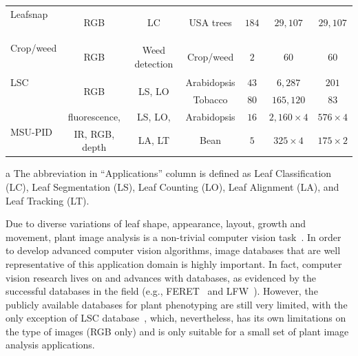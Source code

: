 \begin{table}[t!]
\begin{threeparttable}
\begin{tabular}{l|c|c|c|c|c|c}
Leafsnap & \multirow{2}{*}{RGB} & \multirow{2}{*}{LC} & \multirow{2}{*}{USA trees} & \multirow{2}{*}{$184$} & \multirow{2}{*}{$29,107$} & \multirow{2}{*}{$29,107$} \\
~\cite{kumar2012leafsnap} & & & & & & \\ \hline
Crop/weed & \multirow{2}{*}{RGB} & \multirow{2}{*}{Weed detection} & \multirow{2}{*}{Crop/weed} & \multirow{2}{*}{$2$} & \multirow{2}{*}{$60$} & \multirow{2}{*}{$60$} \\
~\cite{haug2014crop} & & & & & & \\ \hline
LSC & \multirow{2}{*}{RGB} & \multirow{2}{*}{LS, LO} & Arabidopsis & $43$ & $6,287$ & $201$ \\ \cline{4-7}
~\cite{haug2014crop} & & & Tobacco & $80$ & $165,120$ & $83$ \\ \hline
\multirow{2}{*}{MSU-PID} & fluorescence, & LS, LO, & Arabidopsis & $16$ & $2,160\times 4$ & $576\times 4$ \\ \cline{4-7}
& IR, RGB, depth & LA, LT & Bean & $5$ & $325\times 4$ & $175\times 2$ \\ \hline
\hline
\end{tabular}
\begin{tablenotes}
\footnotesize
\item[a] The abbreviation in ``Applications'' column is defined as Leaf Classification (LC), Leaf Segmentation (LS), Leaf Counting (LO), Leaf Alignment (LA), and Leaf Tracking (LT).
\end{tablenotes}
\end{threeparttable}
\label{tab:database}
\end{table}

Due to diverse variations of leaf shape, appearance, layout, growth and movement, plant image analysis is a non-trivial computer vision task~\cite{Minervini2015}.
In order to develop advanced computer vision algorithms, image databases that are well representative of this application domain is highly important.
In fact, computer vision research lives on and advances with databases, as evidenced by the successful databases in the field (e.g., FERET~\cite{Phillips2000} and LFW~\cite{LFW}).
However, the publicly available databases for plant phenotyping are still very limited, with the only exception of LSC database~\cite{scharr2014annotated}, which, nevertheless, has its own limitations on the type of images (RGB only) and is only suitable for a small set of plant image analysis applications.


